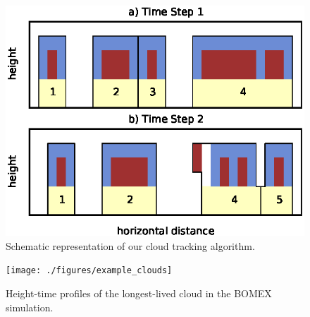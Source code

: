 \documentclass[acp]{copernicus}
\begin{document}
\begin{figure}[t]
\vspace*{2mm}
\begin{center}
\includegraphics[width=\textwidth]{./figures/cloudfinder_instructions}
\end{center}
\caption{Schematic representation of our cloud tracking algorithm.}
\label{fig:cloudfinder_instructions}
\end{figure}

\begin{figure}[t]
\vspace*{2mm}
\begin{center}
\texttt{[image: ./figures/example\_clouds]}
\end{center}
\caption{Height-time profiles of the longest-lived cloud in the BOMEX 
simulation.}
\label{fig:example_clouds}
\end{figure}
\end{document}
